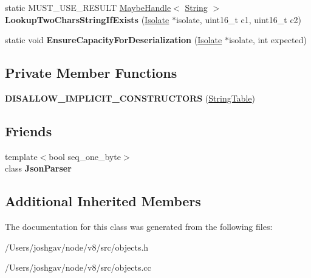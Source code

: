 \begin{DoxyCompactItemize}
\item 
static M\+U\+S\+T\+\_\+\+U\+S\+E\+\_\+\+R\+E\+S\+U\+LT \hyperlink{classv8_1_1internal_1_1_maybe_handle}{Maybe\+Handle}$<$ \hyperlink{classv8_1_1internal_1_1_string}{String} $>$ {\bfseries Lookup\+Two\+Chars\+String\+If\+Exists} (\hyperlink{classv8_1_1internal_1_1_isolate}{Isolate} $\ast$isolate, uint16\+\_\+t c1, uint16\+\_\+t c2)\hypertarget{classv8_1_1internal_1_1_string_table_af4c75301d2ce7b54118523a1b0764b1f}{}\label{classv8_1_1internal_1_1_string_table_af4c75301d2ce7b54118523a1b0764b1f}

\item 
static void {\bfseries Ensure\+Capacity\+For\+Deserialization} (\hyperlink{classv8_1_1internal_1_1_isolate}{Isolate} $\ast$isolate, int expected)\hypertarget{classv8_1_1internal_1_1_string_table_af642d2cd7ddd164366c1935d91916028}{}\label{classv8_1_1internal_1_1_string_table_af642d2cd7ddd164366c1935d91916028}

\end{DoxyCompactItemize}
\subsection*{Private Member Functions}
\begin{DoxyCompactItemize}
\item 
{\bfseries D\+I\+S\+A\+L\+L\+O\+W\+\_\+\+I\+M\+P\+L\+I\+C\+I\+T\+\_\+\+C\+O\+N\+S\+T\+R\+U\+C\+T\+O\+RS} (\hyperlink{classv8_1_1internal_1_1_string_table}{String\+Table})\hypertarget{classv8_1_1internal_1_1_string_table_af9e1c2a405363b061b58001128eebb8b}{}\label{classv8_1_1internal_1_1_string_table_af9e1c2a405363b061b58001128eebb8b}

\end{DoxyCompactItemize}
\subsection*{Friends}
\begin{DoxyCompactItemize}
\item 
{\footnotesize template$<$bool seq\+\_\+one\+\_\+byte$>$ }\\class {\bfseries Json\+Parser}\hypertarget{classv8_1_1internal_1_1_string_table_a9f71fbaae144c73b8be1f30630fdb8da}{}\label{classv8_1_1internal_1_1_string_table_a9f71fbaae144c73b8be1f30630fdb8da}

\end{DoxyCompactItemize}
\subsection*{Additional Inherited Members}


The documentation for this class was generated from the following files\+:\begin{DoxyCompactItemize}
\item 
/\+Users/joshgav/node/v8/src/objects.\+h\item 
/\+Users/joshgav/node/v8/src/objects.\+cc\end{DoxyCompactItemize}
